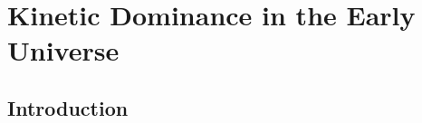 \chapter{Kinetic Dominance in the Early Universe}
\label{chap:kd}

\section{Introduction}
\label{sec:kd:intro}
